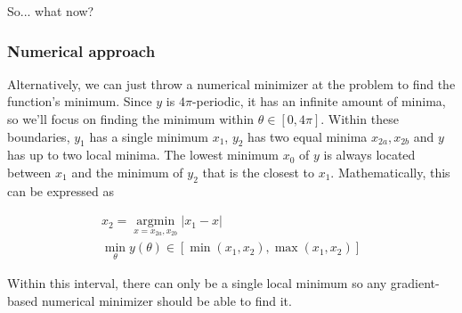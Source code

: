 So... what now?

\subsubsection*{Numerical approach}
Alternatively, we can just throw a numerical minimizer at the problem to find
the function's minimum.
Since $y$ is $4\pi$-periodic, it has an infinite amount of minima, so we'll
focus on finding the minimum within $\theta \in [0, 4\pi]$.
Within these boundaries, $y_1$ has a single minimum $x_1$, $y_2$ has two equal
minima $x_{2a}, x_{2b}$ and $y$ has up to two local minima.
The lowest minimum $x_0$ of $y$ is always located between $x_1$ and the minimum
of $y_2$ that is the closest to $x_1$.
Mathematically, this can be expressed as

\begin{equation}
    \begin{gathered}
        x_2 = \underset{x = x_{2a}, x_{2b}}{\operatorname{argmin}} \left|x_1 - x\right|\\
        \min_\theta y(\theta) \in [\min(x_1, x_2), \max(x_1, x_2)]
    \end{gathered}
\end{equation}

Within this interval, there can only be a single local minimum so any gradient-
based numerical minimizer should be able to find it.
